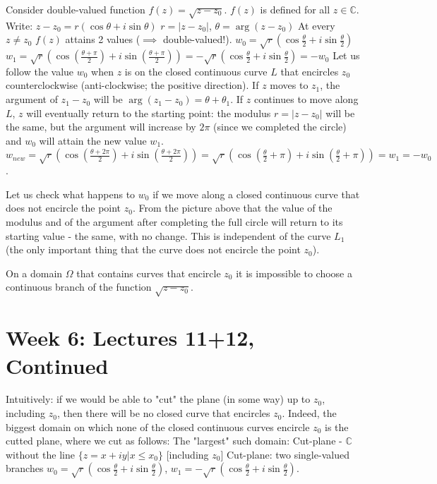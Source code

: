 \documentclass[12pt]{article}
\begin{document}
\begin{example}
Consider double-valued function $f(z) = \sqrt{z-z_0}$.
$f(z)$ is defined for all $z \in \mathbb{C}$. Write:
$z-z_0 = r(\cos\theta + i\sin\theta)$ $r = |z-z_0|$, $\theta = \arg(z-z_0)$
At every $z \neq z_0$ $f(z)$ attains 2 values ($\implies$ double-valued!).
$w_0 = \sqrt{r}(\cos\frac{\theta}{2} + i\sin\frac{\theta}{2})$
$w_1 = \sqrt{r}(\cos(\frac{\theta + \pi}{2}) + i\sin(\frac{\theta + \pi}{2})) = -\sqrt{r}(\cos\frac{\theta}{2} + i\sin\frac{\theta}{2}) = -w_0$
Let us follow the value $w_0$ when $z$ is on the closed continuous curve $L$ that encircles $z_0$ counterclockwise (anti-clockwise; the positive direction).
If $z$ moves to $z_1$, the argument of $z_1 - z_0$ will be $\arg(z_1 - z_0) = \theta + \theta_1$.
If $z$ continues to move along $L$, $z$ will eventually return to the starting point: the modulus $r = |z-z_0|$ will be the same, but the argument will increase by $2\pi$ (since we completed the circle) and $w_0$ will attain the new value $w_1$.
$w_{new} = \sqrt{r}(\cos(\frac{\theta + 2\pi}{2}) + i\sin(\frac{\theta + 2\pi}{2})) = \sqrt{r}(\cos(\frac{\theta}{2} + \pi) + i\sin(\frac{\theta}{2} + \pi)) = w_1 = -w_0$.

Let us check what happens to $w_0$ if we move along a closed continuous curve that does not encircle the point $z_0$.
From the picture above that the value of the modulus and of the argument after completing the full circle will return to its starting value - the same, with no change. This is independent of the curve $L_1$ (the only important thing that the curve does not encircle the point $z_0$).
\end{example}

\begin{corollary}
On a domain $\Omega$ that contains curves that encircle $z_0$ it is impossible to choose a continuous branch of the function $\sqrt{z-z_0}$.
\end{corollary}

\section{Week 6: Lectures 11+12, Continued}

Intuitively: if we would be able to "cut" the plane (in some way) up to $z_0$, including $z_0$, then there will be no closed curve that encircles $z_0$. Indeed, the biggest domain on which none of the closed continuous curves encircle $z_0$ is the cutted plane, where we cut as follows:
The "largest" such domain: Cut-plane - $\mathbb{C}$ without the line $\{z = x+iy| x \leq x_0\}$ [including $z_0$]
Cut-plane: two single-valued branches $w_0 = \sqrt{r}(\cos\frac{\theta}{2} + i\sin\frac{\theta}{2})$, $w_1 = -\sqrt{r}(\cos\frac{\theta}{2} + i\sin\frac{\theta}{2})$.
\end{document}
